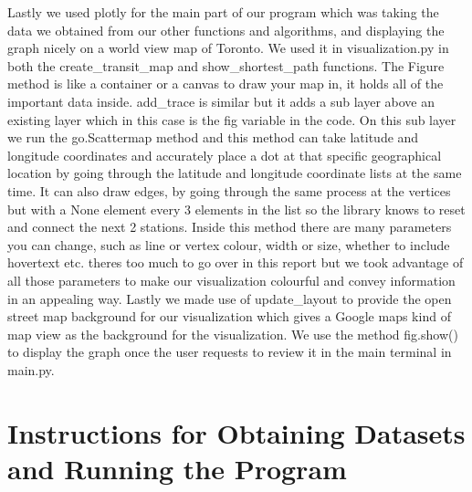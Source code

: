 \documentclass[fontsize=11pt]{article}
\begin{document}
\vspace{1em}

Lastly we used plotly for the main part of our program which was taking the data we obtained from our other functions and algorithms, and displaying the graph nicely on a world view map of Toronto. We used it in visualization.py in both the create\_transit\_map and show\_shortest\_path functions. The Figure method is like a container or a canvas to draw your map in, it holds all of the important data inside. add\_trace is similar but it adds a sub layer above an existing layer which in this case is the fig variable in the code. On this sub layer we run the go.Scattermap method\cite{plotly_scattermap_api} and this method can take latitude and longitude coordinates and accurately place a dot at that specific geographical location by going through the latitude and longitude coordinate lists at the same time. It can also draw edges, by going through the same process at the vertices but with a None element every 3 elements in the list so the library knows to reset and connect the next 2 stations. Inside this method there are many parameters you can change, such as line or vertex colour, width or size, whether to include hovertext etc.\cite{plotly_scattermap_reference} theres too much to go over in this report but we took advantage of all those parameters to make our visualization colourful and convey information in an appealing way. Lastly we made use of update\_layout to provide the open street map background for our visualization which gives a Google maps kind of map view as the background for the visualization. We use the method fig.show() to display the graph once the user requests to review it in the main terminal in main.py.

\section*{Instructions for Obtaining Datasets and Running the Program}
\end{document}
